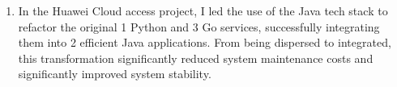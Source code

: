 \documentclass{resume}
\newcommand{\en}[1]{#1}
\newcommand{\zh}[1]{}
\begin{document}
\begin{itemize}
\begin{enumerate}
                  \item \en{In the Huawei Cloud access project, I led the use of the Java tech stack to refactor the original 1 Python and 3 Go services, successfully integrating them into 2 efficient Java applications. From being dispersed to integrated, this transformation significantly reduced system maintenance costs and significantly improved system stability.}
                        \zh{在华为云接入项目中，我主导使用Java技术栈对原有1个Python和3个Go服务的重构，成功整合为2个高效的Java应用。由分散到整合，这一改造显著降低了系统维护成本，并显著提升了系统稳定性。\\}
            \end{enumerate}
\end{itemize}
\en{}
\zh{\rolewithdate{资源管理平台}{后端开发实习生}{2022/03 -- 2023/06}}
\end{document}
